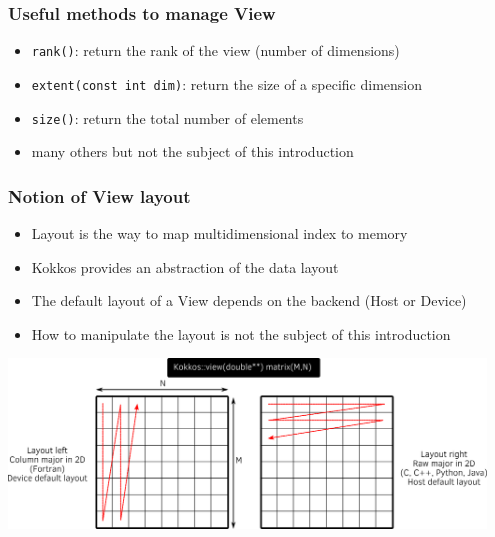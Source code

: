 \documentclass[aspectratio=169]{beamer}
\begin{document}

\begin{frame}[fragile]
    \frametitle{Useful methods to manage View}

\begin{itemize}
    \item \texttt{rank()}: return the rank of the view (number of dimensions)
    \item \texttt{extent(const int dim)}: return the size of a specific dimension
    \item \texttt{size()}: return the total number of elements
    \item many others but not the subject of this introduction
\end{itemize}

\end{frame}


\begin{frame}[fragile]
    \frametitle{Notion of View layout}

\begin{itemize}
    \item Layout is the way to map multidimensional index to memory
    \item Kokkos provides an abstraction of the data layout
    \item The default layout of a View depends on the backend (Host or Device)
    \item How to manipulate the layout is not the subject of this introduction
\end{itemize}

\begin{center}
    \includegraphics[width=0.95\textwidth]{../../images/layout_right_left.png}
    \end{center}

\end{frame}
\end{document}
